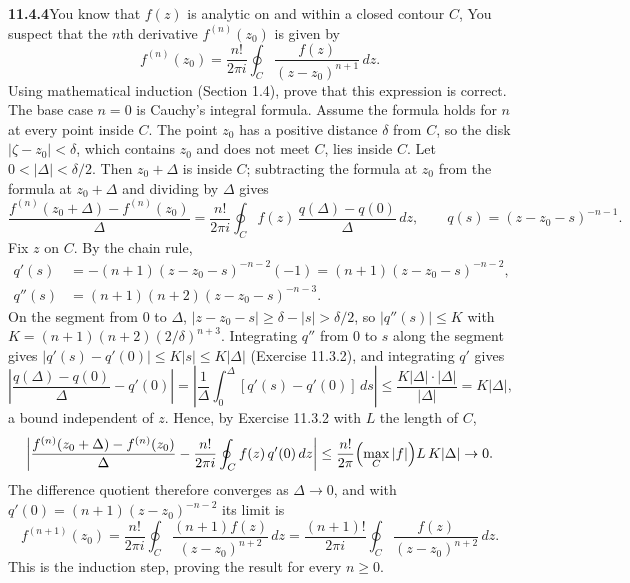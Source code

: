 \par\bigskip
\noindent\textbf{11.4.4}\quad You know that $f(z)$ is analytic on and within a
closed contour $C$,  You suspect that the $n$th derivative $f^{(n)}(z_{0})$ is
given by
\[
f^{(n)}(z_{0})=\frac{n!}{2\pi i}\oint_{C}\frac{f(z)}{(z-z_{0})^{n+1}}\,dz.
\]
Using mathematical induction (Section 1.4), prove that this expression is
correct.
\solution
The base case $n=0$ is Cauchy's integral formula. Assume the formula
holds for $n$ at every point inside $C$. The point $z_0$ has a positive
distance $\delta$ from $C$, so the disk $|\zeta-z_0|<\delta$, which
contains $z_0$ and does not meet $C$, lies inside $C$. Let
$0<|\Delta|<\delta/2$. Then $z_0+\Delta$ is inside $C$; subtracting the
formula at $z_0$ from the formula at $z_0+\Delta$ and dividing by
$\Delta$ gives
\[
\frac{f^{(n)}(z_0+\Delta)-f^{(n)}(z_0)}{\Delta}
=\frac{n!}{2\pi i}\oint_Cf(z)\,\frac{q(\Delta)-q(0)}{\Delta}\,dz,
\qquad q(s)=(z-z_0-s)^{-n-1}.
\]
Fix $z$ on $C$. By the chain rule,
\[
\begin{aligned}
q'(s)&=-(n+1)(z-z_0-s)^{-n-2}(-1)=(n+1)(z-z_0-s)^{-n-2},\\
q''(s)&=(n+1)(n+2)(z-z_0-s)^{-n-3}.
\end{aligned}
\]
On the segment from $0$ to $\Delta$, $|z-z_0-s|\ge\delta-|s|>\delta/2$,
so $|q''(s)|\le K$ with $K=(n+1)(n+2)(2/\delta)^{n+3}$. Integrating
$q''$ from $0$ to $s$ along the segment gives
$|q'(s)-q'(0)|\le K|s|\le K|\Delta|$ (Exercise 11.3.2), and integrating
$q'$ gives
\[
\left|\frac{q(\Delta)-q(0)}{\Delta}-q'(0)\right|
=\left|\frac1\Delta\int_0^\Delta[q'(s)-q'(0)]\,ds\right|
\le\frac{K|\Delta|\cdot|\Delta|}{|\Delta|}=K|\Delta|,
\]
a bound independent of $z$. Hence, by Exercise 11.3.2 with $L$ the
length of $C$,
\[
\left|\frac{f^{(n)}(z_0+\Delta)-f^{(n)}(z_0)}{\Delta}
-\frac{n!}{2\pi i}\oint_Cf(z)\,q'(0)\,dz\right|
\le\frac{n!}{2\pi}\Bigl(\max_C|f|\Bigr)L\,K|\Delta|\to0.
\]
The difference quotient therefore converges as $\Delta\to0$, and with
$q'(0)=(n+1)(z-z_0)^{-n-2}$ its limit is
\[
f^{(n+1)}(z_0)
=\frac{n!}{2\pi i}\oint_C
\frac{(n+1)f(z)}{(z-z_0)^{n+2}}\,dz
=\frac{(n+1)!}{2\pi i}\oint_C
\frac{f(z)}{(z-z_0)^{n+2}}\,dz.
\]
This is the induction step, proving the result for every $n\ge0$.

